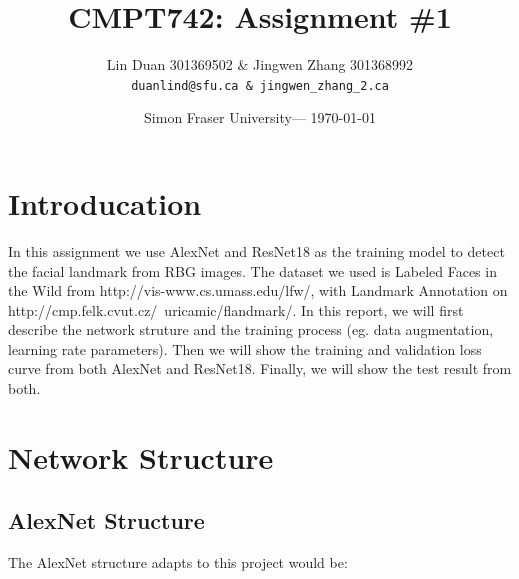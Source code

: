 \documentclass{article}
\title{CMPT742: Assignment \#1} %
\author{Lin Duan 301369502 \& Jingwen Zhang 301368992\\ \texttt{duanlind@sfu.ca \& jingwen\_zhang\_2\@sfu.ca}} %
\date{Simon Fraser University--- \today} %
\begin{document}
\maketitle %


\section*{Introducation} %

In this assignment we use AlexNet and ResNet18 as the training model to detect the facial landmark from RBG images. The dataset we used is Labeled Faces in the Wild from http://vis-www.cs.umass.edu/lfw/, with Landmark Annotation on http://cmp.felk.cvut.cz/~uricamic/flandmark/. In this report, we will first describe the network struture and the training process (eg. data augmentation, learning rate parameters). Then we will show the training and validation loss curve from both AlexNet and ResNet18. Finally, we will show the test result from both.


\section{Network Structure} %




\subsection{AlexNet Structure}

The AlexNet structure adapts to this project would be:
\end{document}
